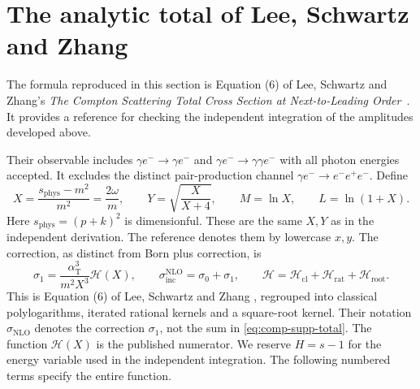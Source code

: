 \section{The analytic total of Lee, Schwartz and Zhang}
The formula reproduced in this section is Equation (6) of
Lee, Schwartz and Zhang's \emph{The Compton Scattering Total Cross
Section at Next-to-Leading Order}~\cite{qed-processes-lsz}.
It provides a reference for checking the independent integration
of the amplitudes developed above.

Their observable includes $\gamma e^-\to\gamma e^-$ and
$\gamma e^-\to\gamma\gamma e^-$ with all photon energies accepted.
It excludes the distinct pair-production channel
$\gamma e^-\to e^-e^+e^-$. Define
\begin{equation}
 X=\frac{s_{\mathrm{phys}}-m^2}{m^2}=\frac{2\omega}{m},\qquad
 Y=\sqrt{\frac{X}{X+4}},\qquad M=\ln X,\qquad L=\ln(1+X).
\end{equation}
Here $s_{\mathrm{phys}}=(p+k)^2$ is dimensionful. These are the same $X,Y$ as in the independent derivation. The
reference denotes them by lowercase $x,y$. The correction,
as distinct from Born plus correction, is
\begin{equation}
 \sigma_1=\frac{\alpha_{\mathrm T}^3}{m^2X^3}\mathcal H(X),\qquad
 \sigma_{\mathrm{inc}}^{\mathrm{NLO}}=\sigma_0+\sigma_1,
 \qquad \mathcal H=\mathcal H_{\mathrm{cl}}+\mathcal H_{\mathrm{rat}}+\mathcal H_{\mathrm{root}}.
 \label{eq:comp-supp-total}
\end{equation}
This is Equation (6) of Lee, Schwartz and Zhang
\cite{qed-processes-lsz}, regrouped into classical polylogarithms,
iterated rational kernels and a square-root kernel.
Their notation $\sigma_{\mathrm{NLO}}$ denotes the correction
$\sigma_1$, not the sum in \eqref{eq:comp-supp-total}.
The function $\mathcal H(X)$ is the published numerator. We reserve
$H=s-1$ for the energy variable used in the independent integration.
The following numbered terms specify the entire function.

